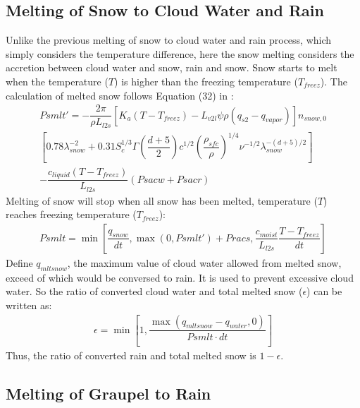 \documentclass[letterpaper,titlepage,10pt]{article}
\numberwithin{equation}{section}
\begin{document}

\subsection{Melting of Snow to Cloud Water and Rain}

Unlike the previous melting of snow to cloud water and rain process, which simply considers the temperature difference, here the snow melting considers the accretion between cloud water and snow, rain and snow. Snow starts to melt when the temperature ($T$) is higher than the freezing temperature ($T_{freez}$). The calculation of melted snow follows Equation (32) in \citet{lin1983bulk}:
\begin{multline}
	Psmlt' = - \dfrac{2 \pi}{\rho L_{l2s}} \left[K_a \left(T - T_{freez} \right) - L_{v2l} \psi \rho \left(q_{s2} - q_{vapor} \right) \right] n_{snow,0} \\
	\left[0.78 \lambda^{-2}_{snow} + 0.31 S^{1/3}_c \Gamma \left(\dfrac{d + 5}{2} \right) c^{1/2} \left(\dfrac{\rho_{sfc}}{\rho} \right)^{1/4} \nu^{-1/2} \lambda^{-\left(d + 5 \right)/2}_{snow} \right] \\
	- \dfrac{c_{liquid} \left(T - T_{freez} \right)}{L_{l2s}} \left(Psacw + Psacr \right)
\end{multline}
Melting of snow will stop when all snow has been melted, temperature ($T$) reaches freezing temperature ($T_{freez}$):
\begin{gather}
	Psmlt = \min \left[\dfrac{q_{snow}}{dt}, \max \left(0, Psmlt' \right) + Pracs, \dfrac{c_{moist}}{L_{l2s}} \dfrac{T - T_{freez}}{dt} \right]
\end{gather}
Define $q_{mltsnow}$, the maximum value of cloud water allowed from melted snow, exceed of which would be conversed to rain. It is used to prevent excessive cloud water. So the ratio of converted cloud water and total melted snow ($\epsilon$) can be written as:
\begin{gather}
	\epsilon = \min \left[1, \dfrac{\max \left(q_{mltsnow} - q_{water}, 0 \right)}{Psmlt \cdot dt} \right]
\end{gather}
Thus, the ratio of converted rain and total melted snow is $1 - \epsilon$.


\subsection{Melting of Graupel to Rain}
\end{document}
